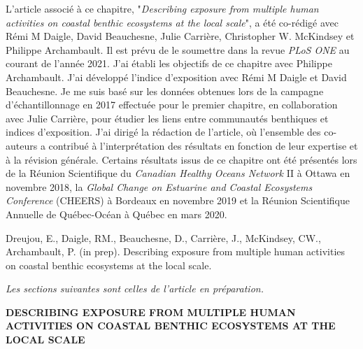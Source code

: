 L'article associé à ce chapitre, "\textit{Describing exposure from multiple human activities on coastal benthic ecosystems at the local scale}", a été co-rédigé avec Rémi M Daigle, David Beauchesne, Julie Carrière, Christopher W. McKindsey et Philippe Archambault. Il est prévu de le soumettre dans la revue \textit{PLoS ONE} au courant de l'année 2021. J'ai établi les objectifs de ce chapitre avec Philippe Archambault. J'ai développé l'indice d'exposition avec Rémi M Daigle et David Beauchesne. Je me suis basé sur les données obtenues lors de la campagne d'échantillonnage en 2017 effectuée pour le premier chapitre, en collaboration avec Julie Carrière, pour étudier les liens entre communautés benthiques et indices d'exposition. J'ai dirigé la rédaction de l'article, où l'ensemble des co-auteurs a contribué à l'interprétation des résultats en fonction de leur expertise et à la révision générale. Certains résultats issus de ce chapitre ont été présentés lors de la Réunion Scientifique du \textit{Canadian Healthy Oceans Network} II à Ottawa en novembre 2018, la \textit{Global Change on Estuarine and Coastal Ecosystems Conference} (CHEERS) à Bordeaux en novembre 2019 et la Réunion Scientifique Annuelle de Québec-Océan à Québec en mars 2020. \linebreak[4]

\begin{singlespace}
Dreujou, E., Daigle, RM., Beauchesne, D., Carrière, J., McKindsey, CW., Archambault, P. (in prep). Describing exposure from multiple human activities on coastal benthic ecosystems at the local scale.
\end{singlespace}

\textit{Les sections suivantes sont celles de l'article en préparation.}

\clearpage

\begin{center}
\textbf{DESCRIBING EXPOSURE FROM MULTIPLE HUMAN ACTIVITIES ON COASTAL BENTHIC ECOSYSTEMS AT THE LOCAL SCALE}
\end{center}
